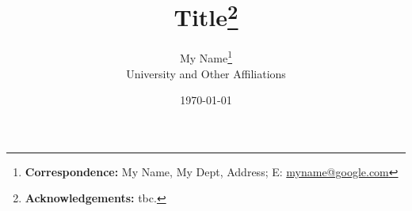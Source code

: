 \documentclass[12pt,letterpaper]{article}
\title{Title\thanks{\textbf{Acknowledgements:} tbc. }}
\author{My Name\thanks{\textbf{Correspondence:} My Name, My Dept, Address; E: \href{mailto:myname@google.com}{myname@google.com}} \\ \small University and Other Affiliations}
\date{\small \monthyeardate \today}
\begin{document}
\maketitle

\begin{abstract}
	\lipsum[1]
\end{abstract}







\newpage

{\small }

\newpage
\begin{appendix}

\end{appendix}
\end{document}
